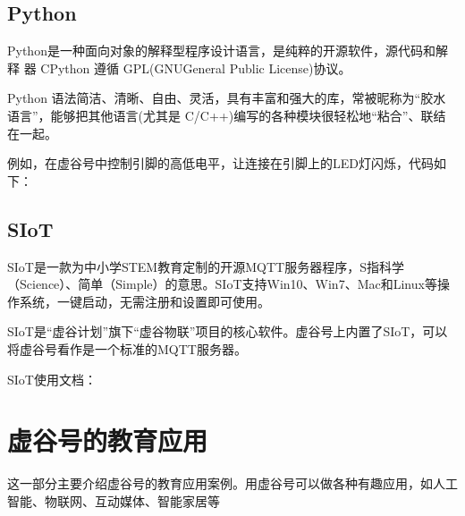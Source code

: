 \documentclass[letterpaper,10pt,english]{sphinxmanual}
\begin{document}
\section{Python}
\label{\detokenize{05.soft/5.5-Python::doc}}\label{\detokenize{05.soft/5.5-Python:python}}
Python是一种面向对象的解释型程序设计语言，是纯粹的开源软件，源代码和解释 器 CPython 遵循 GPL(GNUGeneral Public License)协议。

Python 语法简洁、清晰、自由、灵活，具有丰富和强大的库，常被昵称为“胶水语言”，能够把其他语言(尤其是 C/C++)编写的各种模块很轻松地“粘合”、联结在一起。

例如，在虚谷号中控制引脚的高低电平，让连接在引脚上的LED灯闪烁，代码如下：
\begin{quote}

\begin{sphinxVerbatim}[commandchars=\\\{\}]
   
 
    
 
\end{sphinxVerbatim}
\end{quote}


\section{SIoT}
\label{\detokenize{05.soft/5.6-SIoT:siot}}\label{\detokenize{05.soft/5.6-SIoT::doc}}
SIoT是一款为中小学STEM教育定制的开源MQTT服务器程序，S指科学（Science）、简单（Simple）的意思。SIoT支持Win10、Win7、Mac和Linux等操作系统，一键启动，无需注册和设置即可使用。

SIoT是“虚谷计划”旗下“虚谷物联”项目的核心软件。虚谷号上内置了SIoT，可以将虚谷号看作是一个标准的MQTT服务器。

SIoT使用文档：


\chapter{虚谷号的教育应用}
\label{\detokenize{06.edu/index::doc}}\label{\detokenize{06.edu/index:id1}}
这一部分主要介绍虚谷号的教育应用案例。用虚谷号可以做各种有趣应用，如人工智能、物联网、互动媒体、智能家居等
\end{document}
